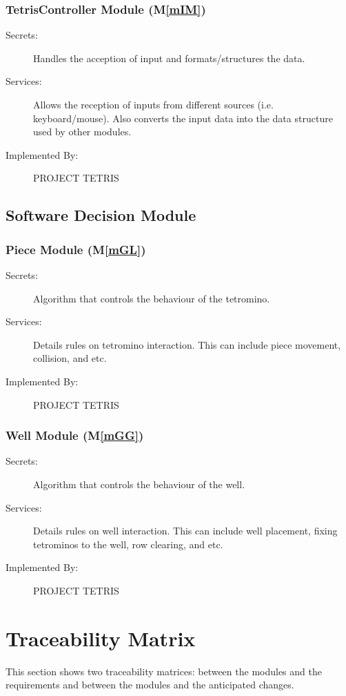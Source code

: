 \documentclass[12pt, titlepage]{article}
\newcommand{\mref}[1]{M\ref{#1}}
\begin{document}
\subsubsection{TetrisController Module (\mref{mIM})}
\begin{description}
\item[Secrets:] Handles the acception of input and formats/structures the data.
\item[Services:] Allows the reception of inputs from different sources (i.e. keyboard/mouse). Also converts the input data
into the data structure used by other modules.
\item[Implemented By:] PROJECT TETRIS
\end{description}

\subsection{Software Decision Module}
\subsubsection{Piece Module  (\mref{mGL})}
\begin{description}
\item[Secrets:] Algorithm that controls the behaviour of the tetromino.
\item[Services:] Details rules on tetromino interaction. This can include
piece movement, collision, and etc.
\item[Implemented By:] PROJECT TETRIS
\end{description}

\subsubsection{Well Module  (\mref{mGG})}
\begin{description}
\item[Secrets:] Algorithm that controls the behaviour of the well.
\item[Services:] Details rules on well interaction. This can include
well placement, fixing tetrominos to the well, row clearing, and etc.
\item[Implemented By:] PROJECT TETRIS
\end{description}


\section{Traceability Matrix} \label{SecTM}
This section shows two traceability matrices: between the modules and the
requirements and between the modules and the anticipated changes.
\end{document}
